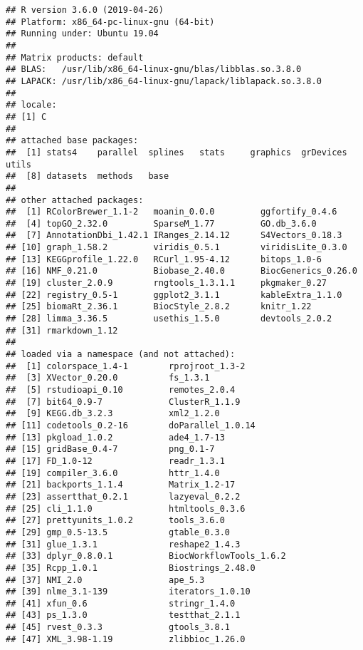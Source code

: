 \documentclass[9pt,a4paper,]{extarticle}
\begin{document}
\begin{verbatim}
## R version 3.6.0 (2019-04-26)
## Platform: x86_64-pc-linux-gnu (64-bit)
## Running under: Ubuntu 19.04
## 
## Matrix products: default
## BLAS:   /usr/lib/x86_64-linux-gnu/blas/libblas.so.3.8.0
## LAPACK: /usr/lib/x86_64-linux-gnu/lapack/liblapack.so.3.8.0
## 
## locale:
## [1] C
## 
## attached base packages:
##  [1] stats4    parallel  splines   stats     graphics  grDevices utils    
##  [8] datasets  methods   base     
## 
## other attached packages:
##  [1] RColorBrewer_1.1-2   moanin_0.0.0         ggfortify_0.4.6     
##  [4] topGO_2.32.0         SparseM_1.77         GO.db_3.6.0         
##  [7] AnnotationDbi_1.42.1 IRanges_2.14.12      S4Vectors_0.18.3    
## [10] graph_1.58.2         viridis_0.5.1        viridisLite_0.3.0   
## [13] KEGGprofile_1.22.0   RCurl_1.95-4.12      bitops_1.0-6        
## [16] NMF_0.21.0           Biobase_2.40.0       BiocGenerics_0.26.0 
## [19] cluster_2.0.9        rngtools_1.3.1.1     pkgmaker_0.27       
## [22] registry_0.5-1       ggplot2_3.1.1        kableExtra_1.1.0    
## [25] biomaRt_2.36.1       BiocStyle_2.8.2      knitr_1.22          
## [28] limma_3.36.5         usethis_1.5.0        devtools_2.0.2      
## [31] rmarkdown_1.12      
## 
## loaded via a namespace (and not attached):
##  [1] colorspace_1.4-1        rprojroot_1.3-2        
##  [3] XVector_0.20.0          fs_1.3.1               
##  [5] rstudioapi_0.10         remotes_2.0.4          
##  [7] bit64_0.9-7             ClusterR_1.1.9         
##  [9] KEGG.db_3.2.3           xml2_1.2.0             
## [11] codetools_0.2-16        doParallel_1.0.14      
## [13] pkgload_1.0.2           ade4_1.7-13            
## [15] gridBase_0.4-7          png_0.1-7              
## [17] FD_1.0-12               readr_1.3.1            
## [19] compiler_3.6.0          httr_1.4.0             
## [21] backports_1.1.4         Matrix_1.2-17          
## [23] assertthat_0.2.1        lazyeval_0.2.2         
## [25] cli_1.1.0               htmltools_0.3.6        
## [27] prettyunits_1.0.2       tools_3.6.0            
## [29] gmp_0.5-13.5            gtable_0.3.0           
## [31] glue_1.3.1              reshape2_1.4.3         
## [33] dplyr_0.8.0.1           BiocWorkflowTools_1.6.2
## [35] Rcpp_1.0.1              Biostrings_2.48.0      
## [37] NMI_2.0                 ape_5.3                
## [39] nlme_3.1-139            iterators_1.0.10       
## [41] xfun_0.6                stringr_1.4.0          
## [43] ps_1.3.0                testthat_2.1.1         
## [45] rvest_0.3.3             gtools_3.8.1           
## [47] XML_3.98-1.19           zlibbioc_1.26.0        

\end{verbatim}
\end{document}
